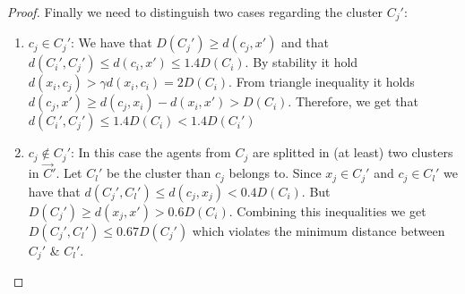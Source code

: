 \begin{proof}
Finally we need to distinguish two cases regarding the cluster $C_j'$: 
\begin{enumerate}
    \item $c_j \in C_j'$:  We have that $D(C_j') \ge d(c_j,x')$ and that $d(C_i',C_j') \le d(c_i,x') \le 1.4 D(C_i)$. By stability it hold $d(x_i,c_j) > \gamma d(x_i,c_i) = 2D(C_i)$. From triangle inequality it holds $d(c_j,x') \ge  d(c_j,x_i)-d(x_i,x') > D(C_i)$. Therefore, we get that $d(C_i',C_j') \le 1.4 D(C_i) < 1.4 D(C_i')$ 
    
    \item $c_j \notin C_j'$: In this case the agents from $C_j$ are splitted in (at least) two clusters in $\vec{C}'$. Let $C_l'$ be the cluster than $c_j$ belongs to. Since $x_j\in C_j'$ and $c_j \in C_l'$ we have that $d(C_j',C_l') \le d(c_j,x_j) < 0.4D(C_i)$. But $D(C_j') \ge d(x_j,x')>0.6D(C_i)$. Combining this inequalities we get $D(C_j',C_l') \le 0.67 D(C_j')$ which violates the minimum distance between  $C_j'$ \& $C_l'$.
\end{enumerate}

\end{proof}


